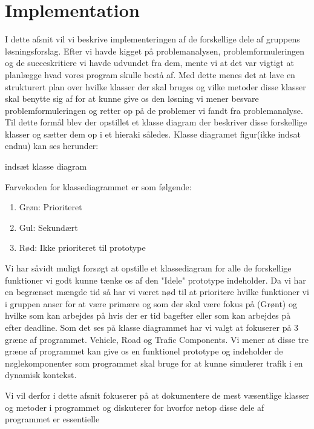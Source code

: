 \chapter{Implementation}\label{Implementation}

I dette afsnit vil vi beskrive implementeringen af de forskellige dele af gruppens løsningsforslag. Efter vi havde kigget på problemanalysen, problemformuleringen og de succeskritiere vi havde udvundet fra dem, mente vi at det var vigtigt at planlægge hvad vores program skulle bestå af. Med dette menes det at lave en strukturert plan over hvilke klasser der skal bruges og vilke metoder disse klasser skal benytte sig af for at kunne give os den løsning vi mener besvare problemformuleringen og retter op på de problemer vi fandt fra problemanalyse. Til dette formål blev der opstillet et klasse diagram der beskriver disse forskellige klasser og sætter dem op i et hieraki således. Klasse diagramet figur(ikke indsat endnu) kan ses herunder:

{indsæt klasse diagram}

Farvekoden for klassediagrammet er som følgende:

\begin{enumerate}
\item Grøn: Prioriteret
\item Gul: Sekundært
\item Rød: Ikke prioriteret til prototype
\end{enumerate}

Vi har såvidt muligt forsøgt at opstille et klassediagram for alle de forskellige funktioner vi godt kunne tænke os af den "Idele" prototype indeholder. Da vi har en begrænset mængde tid så har vi været nød til at prioritere hvilke funktioner vi i gruppen anser for at være primære og som der skal være fokus på (Grønt) og hvilke som kan arbejdes på hvis der er tid bagefter eller som kan arbejdes på efter deadline. Som det ses på klasse diagrammet har vi valgt at fokuserer på 3 græne af programmet. Vehicle, Road og Trafic Components. Vi mener at disse tre græne af programmet kan give os en funktionel prototype og indeholder de nøglekomponenter som programmet skal bruge for at kunne simulerer trafik i en dynamisk kontekst.

Vi vil derfor i dette afsnit fokuserer på at dokumentere de mest væsentlige klasser og metoder i programmet og diskuterer for hvorfor netop disse dele af programmet er essentielle

